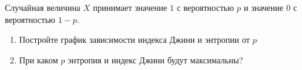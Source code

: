 \documentclass[pdftex,11pt,openany]{book}\usepackage[]{graphicx}\usepackage[]{color}
\begin{document}
\begin{solution}
\end{solution}

\begin{problem}
Случайная величина $X$ принимает значение $1$ с вероятностью $p$ и значение $0$ с вероятностью $1-p$.
\begin{enumerate}
\item Постройте график зависимости индекса Джини и энтропии от $p$
\item При каком $p$ энтропия и индекс Джини будут максимальны?
\end{enumerate}
\end{problem}

\begin{solution}
\end{solution}
\end{document}
